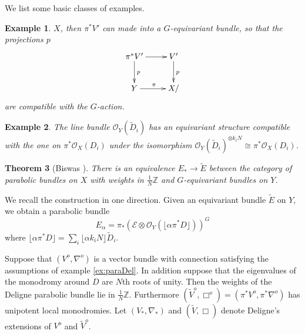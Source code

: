 \documentclass{amsart}
\newtheorem{thm}{Theorem}[section]
\newtheorem{ex}[thm]{Example}
\newcommand {\Z} {{\mathbb Z}}
\newcommand {\E} {{\mathcal E}}
\newcommand {\OO} {{\mathcal O}}
\begin{document}
We list some basic classes of examples.

\begin{ex}\label{ex:pullbackVB}
 $X$, then $\pi^*V'$  can made into a $G$-equivariant bundle, so that the projections $p$
$$
\xymatrix{
 \pi^*V'\ar[r]\ar[d]^{p} & V'\ar[d]^{p} \\ 
 Y\ar[r]^{\pi} & X
/}
$$
are compatible with  the $G$-action. 
\end{ex}

\begin{ex}\label{ex:equiLB}
 The line bundle $\OO_Y(\tilde D_i)$ has an  equivariant structure compatible with the one on $\pi^*\OO_X(D_i)$ under the isomorphism
$\OO_Y(\tilde D_i)^{\otimes k_iN}\cong \pi^* \OO_X(D_i)$.
\end{ex}


\begin{thm}[Biswas {\cite{biswas}}]\label{thm:biswas}
  There is an equivalence $E_*\to \tilde E$ between the category of 
  parabolic bundles on $X$ with weights in $\frac{1}{N}\Z$ and
  $G$-equivariant  bundles on $Y$. 
\end{thm}

We recall the construction in one direction. Given an equivariant bundle $\tilde E$ on
$Y$, we obtain a parabolic bundle
$$E_\alpha = \pi_*(\E\otimes \OO_Y(\lfloor \alpha \pi^*D\rfloor))^G$$
where $ \lfloor \alpha \pi^*D\rfloor=\sum_i \lfloor \alpha k_iN\rfloor
\tilde D_i$.  


Suppose that $(V^o,\nabla^o)$ is a vector bundle with connection satisfying the assumptions of 
example \ref{ex:paraDel}. In addition suppose that the eigenvalues of the   monodromy around $D$
are $N$th roots of unity. Then the weights of the  Deligne  parabolic bundle lie in  
$\frac{1}{N}\Z$.
Furthermore $(\tilde V^o,\Box^o)=(\pi^*V^o,\pi^*\nabla^o)$ has unipotent local monodromies.
Let $(V_*,\nabla_*)$  and $(\tilde V,\Box )$ denote Deligne's extensions of $V^o$ and $\tilde V^o$.
\end{document}
